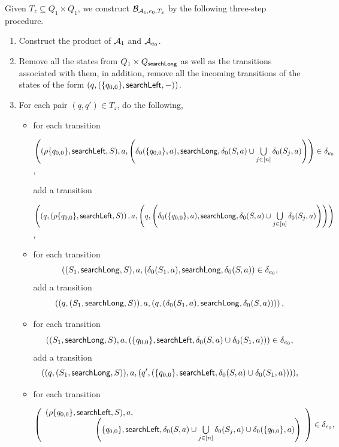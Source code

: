 Given $T_z \subseteq Q_1 \times Q_1$, we construct $\mathcal{B}_{\mathcal{A}_1, e_0,  T_{z}}$ by  the following three-step procedure.
\begin{enumerate}
\item Construct the product of $\mathcal{A}_1$ and $\mathcal{A}_{e_0}$. 

\item Remove all the states from $Q_1 \times Q_{\mathsf{searchLong}}$ as well as the transitions associated with them, in addition, remove all the incoming transitions of the states of the form $(q, (\{q_{0,0}\}, \mathsf{searchLeft},-))$.

\item For each pair $(q,q') \in T_{z}$, do the following,
\begin{itemize}
\item for each transition

\medskip

$\left((\rho \{q_{0,0}\}, \mathsf{searchLeft}, S), a, \left(\delta_0(\{q_{0,0}\}, a), \mathsf{searchLong}, \delta_0(S, a) \cup \bigcup \limits_{j \in [n]} \delta_0(S_j, a) \right) \right) \in \delta_{e_0}$,

\medskip

add a transition

\medskip

$\left( \left(q, (\rho \{q_{0,0}\}, \mathsf{searchLeft}, S) \right), a, \left(q, \left(\delta_0(\{q_{0,0}\}, a), \mathsf{searchLong}, \delta_0(S, a) \cup \bigcup \limits_{j \in [n]} \delta_0(S_j, a) \right) \right) \right)$,

\medskip

%
\item for each transition
		$$((S_1, \mathsf{searchLong}, S), a, (\delta_0(S_1,a), \mathsf{searchLong}, \delta_0(S,a)) \in \delta_{e_0},$$
add a transition 
$$\left((q, (S_1, \mathsf{searchLong}, S)), a, (q, (\delta_0(S_1,a), \mathsf{searchLong}, \delta_0(S,a))) \right),$$
%
\item for each transition
		$$((S_1, \mathsf{searchLong}, S), a, (\{q_{0,0}\}, \mathsf{searchLeft}, \delta_0(S,a) \cup \delta_0(S_1,a))) \in \delta_{e_0},$$
add a transition
		$$((q, (S_1, \mathsf{searchLong}, S)), a, (q', (\{q_{0,0}\}, \mathsf{searchLeft}, \delta_0(S,a) \cup \delta_0(S_1,a)))),$$
%
\item for each transition

\medskip

		$\left(
		\begin{array}{l l}
		(\rho \{q_{0,0}\}, \searchleft, S), a, &\\
		& \hspace{-2cm} \left(\{q_{0,0}\}, \searchleft, \delta_0(S,a) \cup \bigcup \limits_{j \in [n]} \delta_0(S_j, a) \cup \delta_0(\{q_{0,0}\}, a) \right)
		\end{array}
		\right) \in \delta_{e_0},$


\end{itemize}
\end{enumerate}
